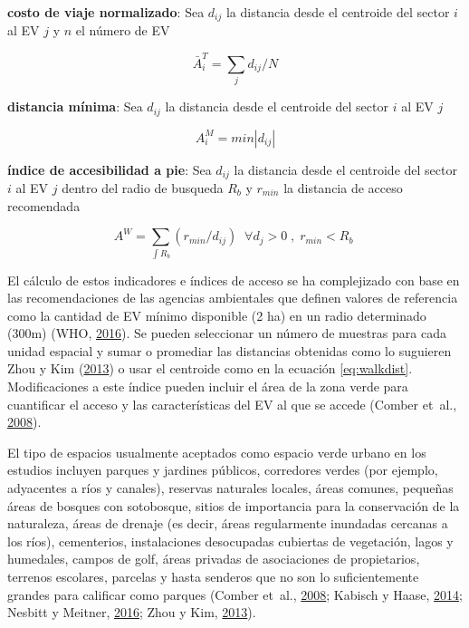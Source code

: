 \documentclass[12pt,a4paper,oneside, openany]{book}
\theoremstyle{definition}
\theoremstyle{definition}
\theoremstyle{definition}
\theoremstyle{remark}
\begin{document}
\textbf{costo de viaje normalizado}: Sea \(d_{ij}\) la distancia desde
el centroide del sector \(i\) al EV \(j\) y \(n\) el número de EV

\begin{equation}
\bar{A}^{T}_i =\sum_j{d_{ij}/N}
\label{eq:ncosto}
\end{equation}

\textbf{distancia mínima}: Sea \(d_{ij}\) la distancia desde el
centroide del sector \(i\) al EV \(j\)

\begin{equation}
A^{M}_i=min\left | d_{ij} \right | 
\label{eq:mindist}
\end{equation}

\textbf{índice de accesibilidad a pie}: Sea \(d_{ij}\) la distancia
desde el centroide del sector \(i\) al EV \(j\) dentro del radio de
busqueda \(R_b\) y \(r_{min}\) la distancia de acceso recomendada

\begin{equation}
A^{W}= \sum_{\int R_b }{(r_{min}/d_{ij})}  \;  \; \forall  d_j>0 \; , \; r_{min}<R_b  \;
\label{eq:walkdist}
\end{equation}

El cálculo de estos indicadores e índices de acceso se ha complejizado
con base en las recomendaciones de las agencias ambientales que definen
valores de referencia como la cantidad de EV mínimo disponible (2 ha) en
un radio determinado (300m) (WHO,
\protect\hyperlink{ref-who2016urban}{2016}). Se pueden seleccionar un
número de muestras para cada unidad espacial y sumar o promediar las
distancias obtenidas como lo suguieren Zhou y Kim
(\protect\hyperlink{ref-zhou_social_2013}{2013}) o usar el centroide
como en la ecuación \eqref{eq:walkdist}. Modificaciones a este índice
pueden incluir el área de la zona verde para cuantificar el acceso y las
características del EV al que se accede (Comber et~al.,
\protect\hyperlink{ref-comber_using_2008}{2008}).

El tipo de espacios usualmente aceptados como espacio verde urbano en
los estudios incluyen parques y jardines públicos, corredores verdes
(por ejemplo, adyacentes a ríos y canales), reservas naturales locales,
áreas comunes, pequeñas áreas de bosques con sotobosque, sitios de
importancia para la conservación de la naturaleza, áreas de drenaje (es
decir, áreas regularmente inundadas cercanas a los ríos), cementerios,
instalaciones desocupadas cubiertas de vegetación, lagos y humedales,
campos de golf, áreas privadas de asociaciones de propietarios, terrenos
escolares, parcelas y hasta senderos que no son lo suficientemente
grandes para calificar como parques (Comber et~al.,
\protect\hyperlink{ref-comber_using_2008}{2008}; Kabisch y Haase,
\protect\hyperlink{ref-kabisch_green_2014}{2014}; Nesbitt y Meitner,
\protect\hyperlink{ref-nesbitt_exploring_2016}{2016}; Zhou y Kim,
\protect\hyperlink{ref-zhou_social_2013}{2013}).
\end{document}
